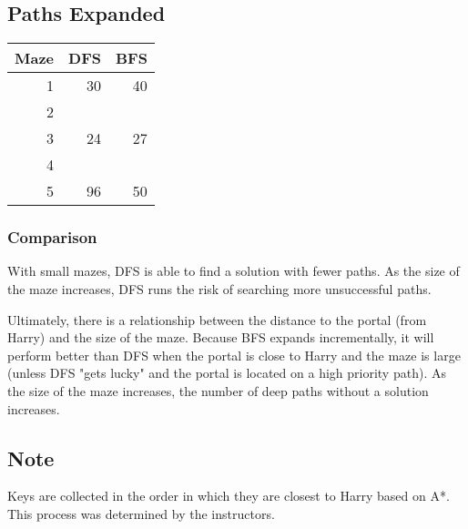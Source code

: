 \documentclass[11pt]{article}
\begin{document}
\subsection{Paths Expanded}
\label{sec:orgc06232f}
\begin{center}
\begin{tabular}{rrr}
Maze & DFS & BFS\\
\hline
1 & 30 & 40\\
2 &  & \\
3 & 24 & 27\\
4 &  & \\
5 & 96 & 50\\
\end{tabular}
\end{center}
\subsubsection{Comparison}
\label{sec:org7a2f068}
With small mazes, DFS is able to find a solution with fewer paths. As the size of the maze increases, DFS runs the risk of searching more unsuccessful paths.

Ultimately, there is a relationship between the distance to the portal (from Harry) and the size of the maze. Because BFS expands incrementally, it will perform better than DFS when the portal is close to Harry and the maze is large (unless DFS "gets lucky" and the portal is located on a high priority path). As the size of the maze increases, the number of deep paths without a solution increases.
\subsection{Note}
\label{sec:org98f88ed}
Keys are collected in the order in which they are closest to Harry based on A*. This process was determined by the instructors.
\end{document}
